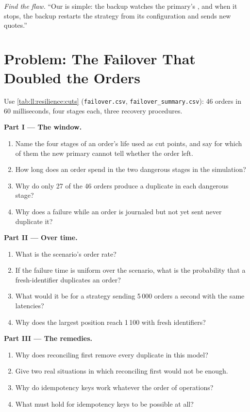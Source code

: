 \begin{exercise}[$\star\star\star$]\label{exo:ll:resilience:8}
\emph{Find the flaw.} ``Our  is simple: the backup watches the primary's , and when it stops, the backup
restarts the strategy from its configuration and sends new quotes.''
\end{exercise}

\section{Problem: The Failover That Doubled the Orders}

\begin{problem}\label{pb:ll:resilience:1}
Use \cref{tab:ll:resilience:cuts} (\texttt{failover.csv}, \texttt{failover\_summary.csv}): 46 orders in 60 milliseconds, four
stages each, three recovery procedures.

\medskip\noindent\textbf{Part I --- The window.}
\begin{enumerate}
\item Name the four stages of an order's life used as cut points, and say for which of them the new primary cannot tell
whether the order left.
\item How long does an order spend in the two dangerous stages in the simulation?
\item Why do only 27 of the 46 orders produce a duplicate in each dangerous stage?
\item Why does a failure while an order is journaled but not yet sent never duplicate it?
\end{enumerate}

\medskip\noindent\textbf{Part II --- Over time.}
\begin{enumerate}[resume]
\item What is the scenario's order rate?
\item If the failure time is uniform over the scenario, what is the probability that a fresh-identifier  duplicates
an order?
\item What would it be for a strategy sending 5\,000 orders a second with the same latencies?
\item Why does the largest position reach 1\,100 with fresh identifiers?
\end{enumerate}

\medskip\noindent\textbf{Part III --- The remedies.}
\begin{enumerate}[resume]
\item Why does reconciling first remove every duplicate in this model?
\item Give two real situations in which reconciling first would not be enough.
\item Why do idempotency keys work whatever the order of operations?
\item What must hold for idempotency keys to be possible at all?
\end{enumerate}


\end{problem}
